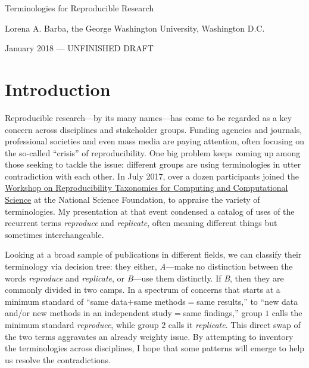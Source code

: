 \documentclass{statement}
\newlength{\up}
\begin{document}

\renewcommand{\thepage} {\arabic{page}}

\thispagestyle{empty}

{\titfont \Huge Terminologies for Reproducible Research} 
\medskip

{ Lorena A. Barba, the George Washington University, Washington D.C. 

January 2018 --- UNFINISHED DRAFT}



\vspace{1cm}

\section*{Introduction}
\vspace{\up}

Reproducible research---by its many names---has come to be regarded as a key concern across disciplines and stakeholder groups. Funding agencies and journals, professional societies and even mass media are paying attention, often focusing on the so-called ``crisis'' of reproducibility. One big problem keeps coming up among those seeking to tackle the issue: different groups are using terminologies in utter contradiction with each other. 
In July 2017, over a dozen participants joined the \href{https://collegeville.github.io/repeto/ReproducibilityWorkshop2017.html}{Workshop on Reproducibility Taxonomies for Computing and Computational Science} at the National Science Foundation, to appraise the variety of terminologies.
My presentation at that event \cite[]{barba2017-repeto} condensed a catalog of uses of the recurrent terms \emph{reproduce} and \emph{replicate}, often meaning different things but sometimes interchangeable.

Looking at a broad sample of publications in different fields, we can classify their terminology via decision tree: they either, \emph{A}---make no distinction between the words \emph{reproduce} and \emph{replicate}, or \emph{B}---use them distinctly.  
If \emph{B}, then they are commonly divided in two camps. 
In a spectrum of concerns that starts at a minimum standard of ``same data$+$same methods$=$same results,'' to ``new data and/or new methods in an independent study$=$same findings,'' group $1$ calls the minimum standard \emph{reproduce}, while group $2$ calls it \emph{replicate}.
This direct swap of the two terms aggravates an already weighty issue.
By attempting to inventory the terminologies across disciplines, I hope that some patterns will emerge to help us resolve the contradictions.
\end{document}
